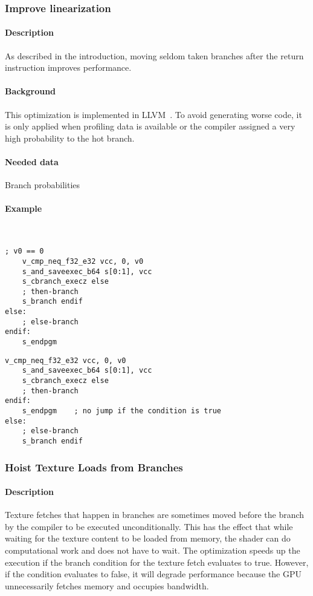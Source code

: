 \subsubsection{Improve linearization}
\paragraph{Description} As described in the introduction, moving seldom taken branches after the return instruction improves performance.
\paragraph{Background} This optimization is implemented in LLVM~\cite{llvmLinearization}. To avoid generating worse code, it is only applied when profiling data is available or the compiler assigned a very high probability to the hot branch.
\paragraph{Needed data} Branch probabilities
\paragraph{Example}\ \\
\begin{minipage}{.47\textwidth}
	\begin{lstlisting}[caption={Linearization --- unoptimized},frame=tlrb,language={[amdgpu]Assembler}]
	; v0 == 0
	v_cmp_neq_f32_e32 vcc, 0, v0
	s_and_saveexec_b64 s[0:1], vcc
	s_cbranch_execz else
	; then-branch
	s_branch endif
else:
	; else-branch
endif:
	s_endpgm
	\end{lstlisting}
\end{minipage}\hfill
\begin{minipage}{.47\textwidth}
	\begin{lstlisting}[caption={Linearization --- optimized},frame=tlrb,language={[amdgpu]Assembler}]
	v_cmp_neq_f32_e32 vcc, 0, v0
	s_and_saveexec_b64 s[0:1], vcc
	s_cbranch_execz else
	; then-branch
endif:
	s_endpgm    ; no jump if the condition is true
else:
	; else-branch
	s_branch endif
	\end{lstlisting}
\end{minipage}

\subsubsection{Hoist Texture Loads from Branches}
\paragraph{Description} Texture fetches that happen in branches are sometimes moved before the branch by the compiler to be executed unconditionally. This has the effect that while waiting for the texture content to be loaded from memory, the shader can do computational work and does not have to wait. The optimization speeds up the execution if the branch condition for the texture fetch evaluates to true. However, if the condition evaluates to false, it will degrade performance because the GPU unnecessarily fetches memory and occupies bandwidth.
